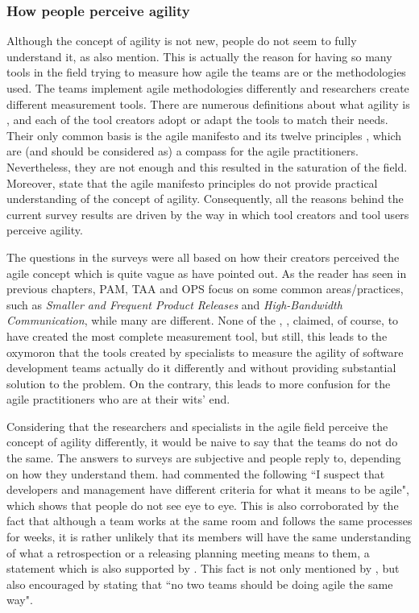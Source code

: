 \subsubsection{How people perceive agility}
Although the concept of agility is not new, people do not seem to fully understand it, as \citet{Wang_Conboy} also mention. This is actually the reason for having so many tools in the field trying to measure how agile the teams are or the methodologies used. The teams implement agile methodologies differently and researchers create different measurement tools. There are numerous definitions about what agility is \cite{Kidd, Kara, Ramesh, agile_manufacturing}, and each of the tool creators adopt or adapt the tools to match their needs. Their only common basis is the agile manifesto \cite{beck2001agile} and its twelve principles \cite{agile_principles}, which are (and should be considered as) a compass for the agile practitioners. Nevertheless, they are not enough and this resulted in the saturation of the field. Moreover, \citet{conboy_fitzgerald} state that the agile manifesto principles do not provide practical understanding of the concept of agility. Consequently, all the reasons behind the current survey results are driven by the way in which tool creators and tool users perceive agility.

The questions in the surveys were all based on how their creators perceived the agile concept which is quite vague as \citet{tsourveloudis} have pointed out. As the reader has seen in previous chapters, \ac{PAM}, \ac{TAA} and \ac{OPS} focus on some common areas/practices, such as  \textit{Smaller and Frequent Product Releases} and \textit{High-Bandwidth Communication}, while many are different. None of the \citet{sventha_dissertation}, \citet{pam}, \citet{Leffingwell} claimed, of course, to have created the most complete measurement tool, but still, this leads to the oxymoron that the tools created by specialists to measure the agility of software development teams actually do it differently and without providing substantial solution to the problem. On the contrary, this leads to more confusion for the agile practitioners who are at their wits' end.

Considering that the researchers and specialists in the agile field perceive the concept of agility differently, it would be naive to say that the teams do not do the same. The answers to surveys are subjective and people reply to, depending on how they understand them. \citet{ambler} had commented the following ``I suspect that developers and management have different criteria for what it means to be agile", which shows that people do not see eye to eye. This is also corroborated by the fact that although a team works at the same room and follows the same processes for weeks, it is rather unlikely that its members will have the same understanding of what a retrospection or a releasing planning meeting means to them, a statement which is also supported by \citet{Williams_Microsoft}. This fact is not only mentioned by \citet{Dave_Thomas}, but also encouraged by stating that ``no two teams should be doing agile the same way".

